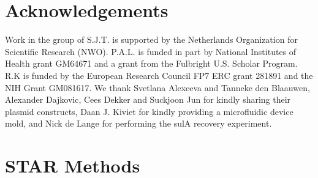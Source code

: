 \section*{Acknowledgements}
Work in the group of S.J.T. is supported by the Netherlands Organization for Scientific Research (NWO). P.A.L. is funded in part by  National Institutes of Health grant GM64671 and a grant from the Fulbright U.S. Scholar Program. R.K is funded by the European Research Council FP7 ERC grant 281891 and the NIH Grant GM081617. We thank Svetlana Alexeeva and Tanneke den Blaauwen, Alexander Dajkovic, Cees Dekker and Suckjoon Jun for kindly sharing their plasmid constructs, Daan J. Kiviet for kindly providing a microfluidic device mold, and Nick de Lange for performing the sulA recovery experiment. 



\FloatBarrier
\clearpage
\section{STAR Methods}



